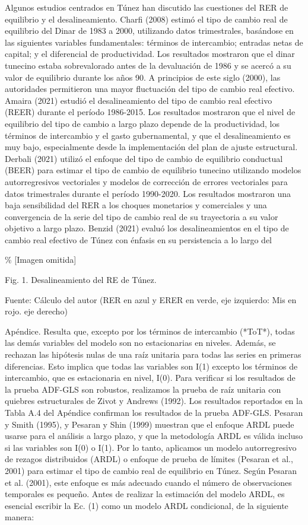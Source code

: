 \documentclass[11pt,a4paper]{article}
\begin{document}
Algunos estudios centrados en Túnez han discutido las cuestiones del RER de equilibrio y el desalineamiento. Charfi (2008) estimó el tipo de cambio real de equilibrio del Dinar de 1983 a 2000, utilizando datos trimestrales, basándose en las siguientes variables fundamentales: términos de intercambio; entradas netas de capital; y el diferencial de productividad. Los resultados mostraron que el dinar tunecino estaba sobrevalorado antes de la devaluación de 1986 y se acercó a su valor de equilibrio durante los años 90. A principios de este siglo (2000), las autoridades permitieron una mayor fluctuación del tipo de cambio real efectivo. Amaira (2021) estudió el desalineamiento del tipo de cambio real efectivo (REER) durante el período 1986-2015. Los resultados mostraron que el nivel de equilibrio del tipo de cambio a largo plazo depende de la productividad, los términos de intercambio y el gasto gubernamental, y que el desalineamiento es muy bajo, especialmente desde la implementación del plan de ajuste estructural. Derbali (2021) utilizó el enfoque del tipo de cambio de equilibrio conductual (BEER) para estimar el tipo de cambio de equilibrio tunecino utilizando modelos autorregresivos vectoriales y modelos de corrección de errores vectoriales para datos trimestrales durante el período 1990-2020. Los resultados mostraron una baja sensibilidad del RER a los choques monetarios y comerciales y una convergencia de la serie del tipo de cambio real de su trayectoria a su valor objetivo a largo plazo. Benzid (2021) evaluó los desalineamientos en el tipo de cambio real efectivo de Túnez con énfasis en su persistencia a lo largo del

\% [Imagen omitida]

Fig. 1. Desalineamiento del RE de Túnez.

Fuente: Cálculo del autor (RER en azul y ERER en verde, eje izquierdo: Mis en rojo. eje derecho)

Apéndice. Resulta que, excepto por los términos de intercambio (*ToT*), todas las demás variables del modelo son no estacionarias en niveles. Además, se rechazan las hipótesis nulas de una raíz unitaria para todas las series en primeras diferencias. Esto implica que todas las variables son I(1) excepto los términos de intercambio, que es estacionaria en nivel, I(0). Para verificar si los resultados de la prueba ADF-GLS son robustos, realizamos la prueba de raíz unitaria con quiebres estructurales de Zivot y Andrews (1992). Los resultados reportados en la Tabla A.4 del Apéndice confirman los resultados de la prueba ADF-GLS. Pesaran y Smith (1995), y Pesaran y Shin (1999) muestran que el enfoque ARDL puede usarse para el análisis a largo plazo, y que la metodología ARDL es válida incluso si las variables son I(0) o I(1). Por lo tanto, aplicamos un modelo autorregresivo de rezagos distribuidos (ARDL) o enfoque de prueba de límites (Pesaran et al., 2001) para estimar el tipo de cambio real de equilibrio en Túnez. Según Pesaran et al. (2001), este enfoque es más adecuado cuando el número de observaciones temporales es pequeño. Antes de realizar la estimación del modelo ARDL, es esencial escribir la Ec. (1) como un modelo ARDL condicional, de la siguiente manera:
\end{document}
